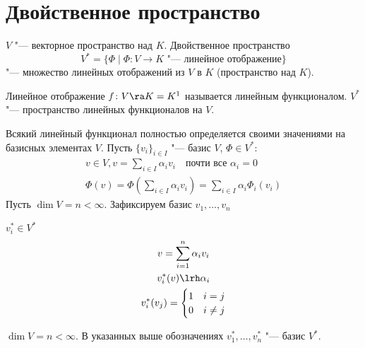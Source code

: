 \section{Двойственное пространство}

\begin{Def}
	$V$ "--- векторное пространство над $K$. Двойственное пространство
	\[ V^* = \{\Phi \mid \text{$\Phi\colon V \to K$ "--- линейное отображение}\} \]
	"--- множество линейных отображений из $V$ в $K$ (пространство над $K$).
\end{Def}
\begin{Def}
	Линейное отображение $f\colon V \ra K = K^1$ называется линейным функционалом.
	$V^*$ "--- пространство линейных функционалов на $V$.
\end{Def}

\begin{Rem}
	Всякий линейный функционал полностью определяется своими значениями на базисных элементах $V$.
	Пусть $\{v_i\}_{i \in I}$ "--- базис $V$, $\Phi \in V^*$:
	\begin{gather*}
		v \in V, v = \sum_{i \in I}\alpha_i v_i \quad \text{почти все $\alpha_i = 0$} \\
		\Phi(v) = \Phi \left(\sum_{i \in I}\alpha_i v_i\right) = \sum_{i \in I}\alpha_i\Phi_i(v_i)
	\end{gather*}
	Пусть $\dim V = n < \infty$. Зафиксируем базис $v_1, \dots, v_n$
\end{Rem}

$v_i^* \in V^*$
\begin{gather*}
	v = \sum_{i=1}^n \alpha_i v_i \\
	v_i^*(v) \lrh \alpha_i \\
	v_i^*(v_j) = \begin{cases}
		1 & i = j \\
		0 & i \ne j
	\end{cases}
\end{gather*}

\begin{theorem}
	$\dim V = n < \infty$.
	В указанных выше обозначениях $v_1^*, \dots, v_n^*$ "--- базис $V^*$.
\end{theorem}

